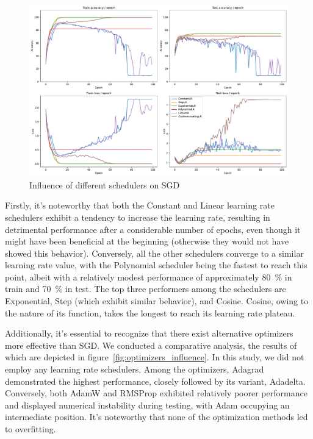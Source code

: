 \documentclass{article}
\theoremstyle{plain}%
\theoremstyle{definition}
\theoremstyle{remark}
\begin{document}
\begin{figure}[H]
    \centering
    \includegraphics*[width=\textwidth]{figs/CNN/schedulers_influence.pdf}
    \caption{Influence of different schedulers on SGD}
    \label{fig:schedulers_influence}
\end{figure}

Firstly, it's noteworthy that both the Constant and Linear learning rate schedulers exhibit a tendency to increase the learning rate, resulting in detrimental performance after a considerable number of epochs, even though it might have been beneficial at the beginning (otherwise they would not have showed this behavior). Conversely, all the other schedulers converge to a similar learning rate value, with the Polynomial scheduler being the fastest to reach this point, albeit with a relatively modest performance of approximately 80~\% in train and 70~\% in test. The top three performers among the schedulers are Exponential, Step (which exhibit similar behavior), and Cosine. Cosine, owing to the nature of its function, takes the longest to reach its learning rate plateau.

Additionally, it's essential to recognize that there exist alternative optimizers more effective than SGD. We conducted a comparative analysis, the results of which are depicted in figure~\ref{fig:optimizers_influence}. In this study, we did not employ any learning rate schedulers. Among the optimizers, Adagrad demonstrated the highest performance, closely followed by its variant, Adadelta. Conversely, both AdamW and RMSProp exhibited relatively poorer performance and displayed numerical instability during testing, with Adam occupying an intermediate position. It's noteworthy that none of the optimization methods led to overfitting.
\end{document}
